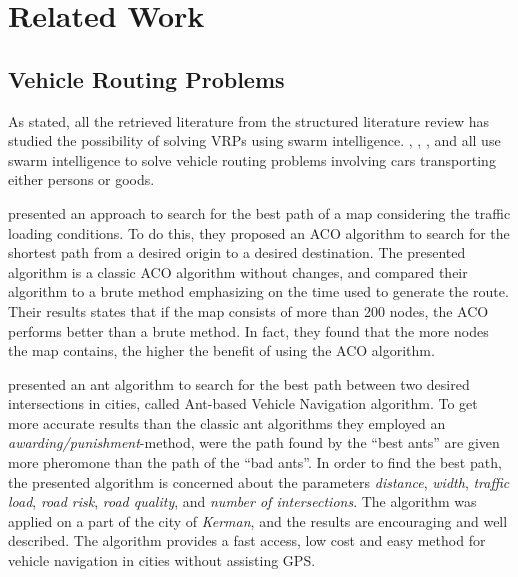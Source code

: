 \section{Related Work}
\label{sec:relatedWork}



\subsection{Vehicle Routing Problems}

As stated, all the retrieved literature from the structured literature review has studied the possibility of solving VRPs using swarm intelligence. \citet{hsiao04}, \citet{salehi-nezhad07}, \citet{tripathi09}, \citet{salehinejad10} and \citet{sedighpour14} all use swarm intelligence to solve vehicle routing problems involving cars transporting either persons or goods.

\citet{hsiao04} presented an approach to search for the best path of a map considering the traffic loading conditions. To do this, they proposed an ACO algorithm to search for the shortest path from a desired origin to a desired destination. The presented algorithm is a classic ACO algorithm without changes, and compared their algorithm to a brute method emphasizing on the time used to generate the route. Their results states that if the map consists of more than 200 nodes, the ACO performs better than a brute method. In fact, they found that the more nodes the map contains, the higher the benefit of using the ACO algorithm. 

\citet{salehi-nezhad07} presented an ant algorithm to search for the best path between two desired  intersections in cities, called Ant-based Vehicle Navigation algorithm. To get more accurate results than the classic ant algorithms they employed an \textit{awarding/punishment}-method, were the path found by the ``best ants'' are given more pheromone than the path of the ``bad ants''. In order to find the best path, the presented algorithm is concerned about the parameters \textit{distance}, \textit{width}, \textit{traffic load}, \textit{road risk}, \textit{road quality}, and \textit{number of intersections}. The algorithm was applied on a part of the city of \textit{Kerman}, and the results are encouraging and well described. The algorithm provides a fast access, low cost and easy method for vehicle navigation in cities without assisting GPS.

